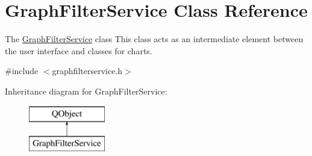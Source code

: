 \hypertarget{class_graph_filter_service}{}\section{Graph\+Filter\+Service Class Reference}
\label{class_graph_filter_service}


The \hyperlink{class_graph_filter_service}{Graph\+Filter\+Service} class This class acts as an intermediate element between the user interface and classes for charts.  




{\ttfamily \#include $<$graphfilterservice.\+h$>$}

Inheritance diagram for Graph\+Filter\+Service\+:\begin{figure}[H]
\begin{center}
\leavevmode
\includegraphics[height=2.000000cm]{class_graph_filter_service}
\end{center}
\end{figure}
